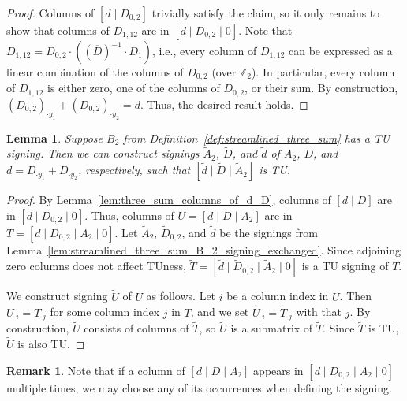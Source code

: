 \documentclass{article}
\newtheorem{lemma}{Lemma}
\theoremstyle{definition}
\newtheorem{remark}{Remark}
\begin{document}
\begin{proof}
    Columns of $[d \mid D_{0, 2}]$ trivially satisfy the claim, so it only remains to show that columns of $D_{1, 12}$ are in $[d \mid D_{0, 2} \mid 0]$. Note that $D_{1, 12} = D_{0, 2} \cdot ((\overline{D})^{-1} \cdot D_{1})$, i.e., every column of $D_{1, 12}$ can be expressed as a linear combination of the columns of $D_{0, 2}$ (over $\mathbb{Z}_{2}$). In particular, every column of $D_{1, 12}$ is either zero, one of the columns of $D_{0, 2}$, or their sum. By construction, $(D_{0, 2})_{\cdot y_{1}} + (D_{0, 2})_{\cdot y_{2}} = d$. Thus, the desired result holds.
\end{proof}

\begin{lemma}\label{lem:streamlined_three_sum_d_D_A_2_signing}
    Suppose $B_{2}$ from Definition~\ref{def:streamlined_three_sum} has a TU signing. Then we can construct signings $\tilde{A}_{2}$, $\tilde{D}$, and $\tilde{d}$ of $A_{2}$, $D$, and $d = D_{\cdot y_{1}} + D_{\cdot y_{2}}$, respectively, such that $[\tilde{d} \mid \tilde{D} \mid \tilde{A}_{2}]$ is TU.
\end{lemma}

\begin{proof}
    By Lemma~\ref{lem:three_sum_columns_of_d_D}, columns of $[d \mid D]$ are in $[d \mid D_{0, 2} \mid 0]$. Thus, columns of $U = [d \mid D \mid A_{2}]$ are in $T = [d \mid D_{0, 2} \mid A_{2} \mid 0]$. Let $\tilde{A}_{2}$, $\tilde{D}_{0, 2}$, and $\tilde{d}$ be the signings from Lemma~\ref{lem:streamlined_three_sum_B_2_signing_exchanged}. Since adjoining zero columns does not affect TUness, $\tilde{T} = [\tilde{d} \mid \tilde{D}_{0, 2} \mid \tilde{A}_{2} \mid 0]$ is a TU signing of $T$.

    We construct signing $\tilde{U}$ of $U$ as follows. Let $i$ be a column index in $U$. Then $U_{\cdot i} = T_{\cdot j}$ for some column index $j$ in $T$, and we set $\tilde{U}_{\cdot i} = \tilde{T}_{\cdot j}$ with that $j$. By construction, $\tilde{U}$ consists of columns of $\tilde{T}$, so $\tilde{U}$ is a submatrix of $\tilde{T}$. Since $\tilde{T}$ is TU, $\tilde{U}$ is also TU.
\end{proof}

\begin{remark}
    Note that if a column of $[d \mid D \mid A_{2}]$ appears in $[d \mid D_{0, 2} \mid A_{2} \mid 0]$ multiple times, we may choose any of its occurrences when defining the signing.
\end{remark}
\end{document}
